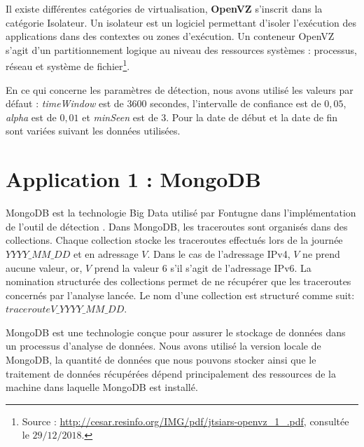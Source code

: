 \begin{tcolorbox}
	
	Il existe différentes catégories de virtualisation, \textbf{OpenVZ} s'inscrit dans la catégorie Isolateur. Un isolateur est un logiciel permettant d'isoler l'exécution des applications dans des contextes ou zones d'exécution. Un conteneur OpenVZ s'agit d'un partitionnement logique au niveau des ressources systèmes : processus, réseau et système de fichier\footnote{Source : \url{http://cesar.resinfo.org/IMG/pdf/jtsiars-openvz_1_.pdf}, consultée le $29/12/2018$.}.
\end{tcolorbox}


En ce qui concerne les paramètres de détection, nous avons utilisé les valeurs par défaut : \textit{timeWindow} est de $ 3600 $ secondes, l'intervalle de confiance est de $0,05$, \textit{alpha} est de $ 0,01 $ et \textit{minSeen} est de $3$. Pour la date de début et la date de fin sont variées suivant les données utilisées.

\section{Application 1 : MongoDB}

MongoDB est la technologie Big Data utilisé par  Fontugne  dans l'implémentation de l'outil de détection \cite{InternetHealthReport}. Dans MongoDB, les traceroutes sont organisés  dans des collections.  Chaque collection stocke les traceroutes effectués lors de la journée $YYYY\_MM\_DD$ et en adressage $V$. Dans le  cas de l'adressage IPv4, $V$  ne prend aucune valeur,  or, $V$ prend la valeur $6$ s'il s'agit de l'adressage IPv6.  La nomination structurée des collections permet de ne récupérer que les traceroutes concernés par l'analyse lancée. Le nom d'une collection est structuré comme suit: 	$tracerouteV\_YYYY\_MM\_DD$.
 

 
 MongoDB est une technologie conçue pour assurer  le stockage de données dans un processus d'analyse de données. Nous avons utilisé la version locale de MongoDB, la quantité de données que nous pouvons stocker ainsi que le traitement de données récupérées dépend principalement des ressources de la machine dans laquelle MongoDB est installé.
 
